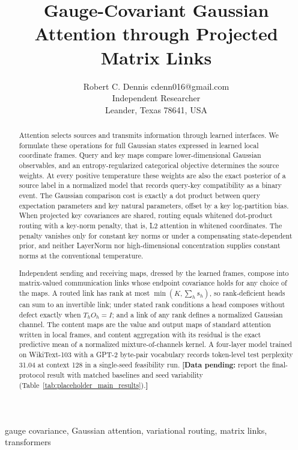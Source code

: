 \documentclass[twoside,11pt]{article}
\providecommand{\datapending}[1]{{\color{red!60!black}\textbf{[Data pending:} #1\textbf{]}}}
\begin{document}

\title{Gauge-Covariant Gaussian Attention through Projected Matrix Links}

\author{\name Robert C. Dennis \email cdenn016@gmail.com \\
  \addr Independent Researcher\\
  \addr Leander, Texas 78641, USA}


\maketitle


\begin{abstract}
Attention selects sources and transmits information through learned interfaces. We formulate these operations for full Gaussian states expressed in learned local coordinate frames. Query and key maps compare lower-dimensional Gaussian observables, and an entropy-regularized categorical objective determines the source weights. At every positive temperature these weights are also the exact posterior of a source label in a normalized model that records query-key compatibility as a binary event. The Gaussian comparison cost is exactly a dot product between query expectation parameters and key natural parameters, offset by a key log-partition bias. When projected key covariances are shared, routing equals whitened dot-product routing with a key-norm penalty, that is, L2 attention in whitened coordinates. The penalty vanishes only for constant key norms or under a compensating state-dependent prior, and neither LayerNorm nor high-dimensional concentration supplies constant norms at the conventional temperature.

Independent sending and receiving maps, dressed by the learned frames, compose into matrix-valued communication links whose endpoint covariance holds for any choice of the maps. A routed link has rank at most $\min(K,\sum_hs_h)$, so rank-deficient heads can sum to an invertible link; under stated rank conditions a head composes without defect exactly when $T_hO_h=I$; and a link of any rank defines a normalized Gaussian channel. The content maps are the value and output maps of standard attention written in local frames, and content aggregation with its residual is the exact predictive mean of a normalized mixture-of-channels kernel. A four-layer model trained on WikiText-103 with a GPT-2 byte-pair vocabulary records token-level test perplexity 31.04 at context 128 in a single-seed feasibility run.
\datapending{report the final-protocol result with matched baselines and seed variability (Table~\ref{tab:placeholder_main_results}).} %

\end{abstract}
\begin{keywords}
gauge covariance, Gaussian attention, variational routing, matrix links, transformers
\end{keywords}
\end{document}
